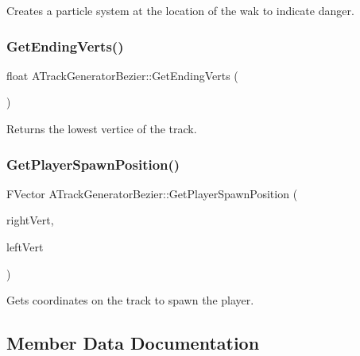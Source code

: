 Creates a particle system at the location of the wak to indicate danger. 

\mbox{\label{class_a_track_generator_bezier_ab3623ddd81be538a80c1c6356c0a1740}} 
\subsubsection{\texorpdfstring{GetEndingVerts()}{GetEndingVerts()}}
{\footnotesize\ttfamily float A\+Track\+Generator\+Bezier\+::\+Get\+Ending\+Verts (\begin{DoxyParamCaption}{ }\end{DoxyParamCaption})}



Returns the lowest vertice of the track. 

\mbox{\label{class_a_track_generator_bezier_a383bbfd04a3daeb4afbeb54d76504890}} 
\subsubsection{\texorpdfstring{GetPlayerSpawnPosition()}{GetPlayerSpawnPosition()}}
{\footnotesize\ttfamily F\+Vector A\+Track\+Generator\+Bezier\+::\+Get\+Player\+Spawn\+Position (\begin{DoxyParamCaption}\item[{F\+Vector}]{right\+Vert,  }\item[{F\+Vector}]{left\+Vert }\end{DoxyParamCaption})}



Gets coordinates on the track to spawn the player. 



\subsection{Member Data Documentation}
\mbox{\label{class_a_track_generator_bezier_afcd90d4b734a7aa568136c4a99fedc90}} 
